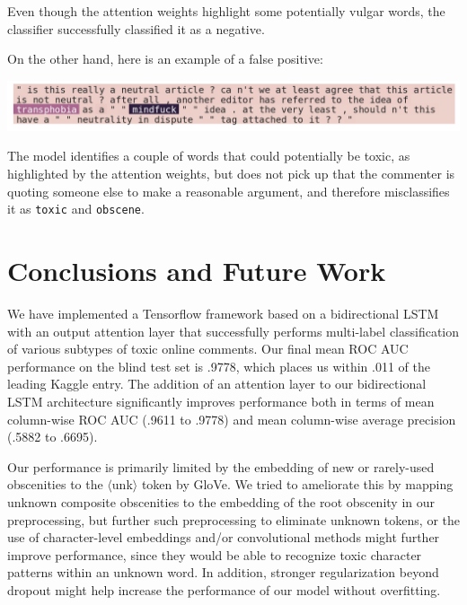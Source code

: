 \documentclass{article} %
\begin{document}
Even though the attention weights highlight some potentially vulgar words, the classifier successfully classified it as a negative. 

On the other hand, here is an example of a false positive:

\includegraphics[width=\textwidth]{false_positive_toxic_obscene.png}

The model identifies a couple of words that could potentially be toxic, as highlighted by the attention weights, but does not pick up that the commenter is quoting someone else to make a reasonable argument, and therefore misclassifies it as \texttt{toxic} and \texttt{obscene}.





\section{Conclusions and Future Work}

We have implemented a Tensorflow framework based on a bidirectional LSTM with an output attention layer that successfully performs multi-label classification of various subtypes of toxic online comments. Our final mean ROC AUC performance on the blind test set is .9778, which places us within .011 of the leading Kaggle entry. The addition of an attention layer to our bidirectional LSTM architecture significantly improves performance both in terms of mean column-wise ROC AUC (.9611 to .9778) and mean column-wise average precision (.5882 to .6695).

Our performance is primarily limited by the embedding of new or rarely-used obscenities to the $\langle$unk$\rangle$ token by GloVe. We tried to ameliorate this by mapping unknown composite obscenities to the embedding of the root obscenity in our preprocessing, but further such preprocessing to eliminate unknown tokens, or the use of character-level embeddings and/or convolutional methods might further improve performance, since they would be able to recognize toxic character patterns within an unknown word. In addition, stronger regularization beyond dropout might help increase the performance of our model without overfitting.
\end{document}
